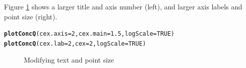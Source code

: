 \documentclass[a4paper,11pt]{article}\usepackage[]{graphicx}\usepackage[]{color}
\makeatletter
\newcommand{\hlnum}[1]{\textcolor[rgb]{0.686,0.059,0.569}{#1}}%
\newcommand{\hlstd}[1]{\textcolor[rgb]{0.345,0.345,0.345}{#1}}%
\newcommand{\hlkwc}[1]{\textcolor[rgb]{0.333,0.667,0.333}{#1}}%
\newcommand{\hlkwd}[1]{\textcolor[rgb]{0.737,0.353,0.396}{\textbf{#1}}}%
\newenvironment{kframe}{%
 \def\at@end@of@kframe{}%
 \ifinner\ifhmode%
  \def\at@end@of@kframe{\end{minipage}}%
  \begin{minipage}{\columnwidth}%
 \fi\fi%
 \def\FrameCommand##1{\hskip\@totalleftmargin \hskip-\fboxsep
 \colorbox{shadecolor}{##1}\hskip-\fboxsep
     \hskip-\linewidth \hskip-\@totalleftmargin \hskip\columnwidth}%
 \MakeFramed {\advance\hsize-\width
   \@totalleftmargin\z@ \linewidth\hsize
   \@setminipage}}%
 {\par\unskip\endMakeFramed%
 \at@end@of@kframe}
\newenvironment{knitrout}{}{} %
\makeatother
\begin{document}
Figure \ref{fig:adjustSize} shows a larger title and axis number (left), and larger axis labels and point size (right).
\begin{knitrout}
\color{fgcolor}\begin{kframe}
\begin{alltt}
\hlkwd{plotConcQ}\hlstd{(}\hlkwc{cex.axis}\hlstd{=}\hlnum{2}\hlstd{,}\hlkwc{cex.main}\hlstd{=}\hlnum{1.5}\hlstd{,}\hlkwc{logScale}\hlstd{=}\hlnum{TRUE}\hlstd{)}
\hlkwd{plotConcQ}\hlstd{(}\hlkwc{cex.lab}\hlstd{=}\hlnum{2}\hlstd{,}\hlkwc{cex}\hlstd{=}\hlnum{2}\hlstd{,}\hlkwc{logScale}\hlstd{=}\hlnum{TRUE}\hlstd{)}
\end{alltt}
\end{kframe}\begin{figure}[]
\caption[Modifying text and point size]{Modifying text and point size\label{fig:adjustSize}}
\end{figure}


\end{knitrout}
\end{document}
